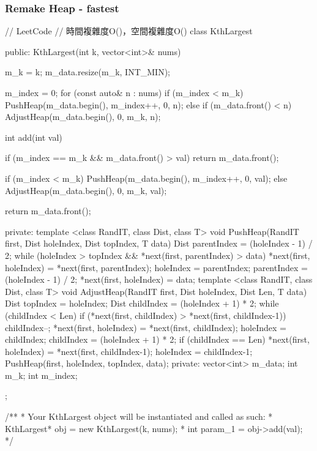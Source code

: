 \subsubsection{Remake Heap - fastest}
\begin{Code}
// LeetCode
// 時間複雜度O()，空間複雜度O()
class KthLargest {
public:
    KthLargest(int k, vector<int>& nums) {
        m_k = k;
        m_data.resize(m_k, INT_MIN);

        m_index = 0;
        for (const auto& n : nums)
        {
            if (m_index < m_k)
                PushHeap(m_data.begin(), m_index++, 0, n);
            else
            {
                if (m_data.front() < n)
                    AdjustHeap(m_data.begin(), 0, m_k, n);
            }
        }
    }

    int add(int val) {
        if (m_index == m_k && m_data.front() > val) return m_data.front();

        if (m_index < m_k)
            PushHeap(m_data.begin(), m_index++, 0, val);
        else
            AdjustHeap(m_data.begin(), 0, m_k, val);

        return m_data.front();
    }
private:
    template <class RandIT, class Dist, class T>
        void PushHeap(RandIT first, Dist holeIndex, Dist topIndex, T data)
    {
        Dist parentIndex = (holeIndex - 1) / 2;
        while (holeIndex > topIndex && *next(first, parentIndex) > data)
        {
            *next(first, holeIndex) = *next(first, parentIndex);
            holeIndex = parentIndex;
            parentIndex = (holeIndex - 1) / 2;
        }
        *next(first, holeIndex) = data;
    }
    template <class RandIT, class Dist, class T>
        void AdjustHeap(RandIT first, Dist holeIndex, Dist Len, T data)
    {
        Dist topIndex = holeIndex;
        Dist childIndex = (holeIndex + 1) * 2;
        while (childIndex < Len)
        {
            if (*next(first, childIndex) > *next(first, childIndex-1))
                childIndex--;
            *next(first, holeIndex) = *next(first, childIndex);
            holeIndex = childIndex;
            childIndex = (holeIndex + 1) * 2;
        }
        if (childIndex == Len)
        {
            *next(first, holeIndex) = *next(first, childIndex-1);
            holeIndex = childIndex-1;
        }
        PushHeap(first, holeIndex, topIndex, data);
    }
private:
    vector<int> m_data;
    int m_k;
    int m_index;
};

/**
 * Your KthLargest object will be instantiated and called as such:
 * KthLargest* obj = new KthLargest(k, nums);
 * int param_1 = obj->add(val);
 */
\end{Code}

